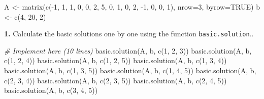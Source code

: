 \documentclass[
]{article}
\newenvironment{Shaded}{\begin{snugshade}}{\end{snugshade}}
\newcommand{\AttributeTok}[1]{\textcolor[rgb]{0.77,0.63,0.00}{#1}}
\newcommand{\CommentTok}[1]{\textcolor[rgb]{0.56,0.35,0.01}{\textit{#1}}}
\newcommand{\ConstantTok}[1]{\textcolor[rgb]{0.00,0.00,0.00}{#1}}
\newcommand{\DecValTok}[1]{\textcolor[rgb]{0.00,0.00,0.81}{#1}}
\newcommand{\FunctionTok}[1]{\textcolor[rgb]{0.00,0.00,0.00}{#1}}
\newcommand{\NormalTok}[1]{#1}
\newcommand{\OtherTok}[1]{\textcolor[rgb]{0.56,0.35,0.01}{#1}}
\newcommand{\SpecialCharTok}[1]{\textcolor[rgb]{0.00,0.00,0.00}{#1}}
\begin{document}
\begin{Shaded}
\begin{Highlighting}[]
\NormalTok{A }\OtherTok{\textless{}{-}} \FunctionTok{matrix}\NormalTok{(}\FunctionTok{c}\NormalTok{(}\SpecialCharTok{{-}}\DecValTok{1}\NormalTok{, }\DecValTok{1}\NormalTok{, }\DecValTok{1}\NormalTok{, }\DecValTok{0}\NormalTok{, }\DecValTok{0}\NormalTok{, }\DecValTok{2}\NormalTok{, }\DecValTok{5}\NormalTok{, }\DecValTok{0}\NormalTok{, }\DecValTok{1}\NormalTok{, }\DecValTok{0}\NormalTok{, }\DecValTok{2}\NormalTok{, }\SpecialCharTok{{-}}\DecValTok{1}\NormalTok{, }\DecValTok{0}\NormalTok{, }\DecValTok{0}\NormalTok{, }\DecValTok{1}\NormalTok{), }\AttributeTok{nrow=}\DecValTok{3}\NormalTok{, }\AttributeTok{byrow=}\ConstantTok{TRUE}\NormalTok{)}
\NormalTok{b }\OtherTok{\textless{}{-}} \FunctionTok{c}\NormalTok{(}\DecValTok{4}\NormalTok{, }\DecValTok{20}\NormalTok{, }\DecValTok{2}\NormalTok{)}
\end{Highlighting}
\end{Shaded}

\textbf{1.} Calculate the basic solutions one by one using the function
\texttt{basic.solution}..

\begin{Shaded}
\begin{Highlighting}[]
\CommentTok{\# Implement here (10 lines)}
\FunctionTok{basic.solution}\NormalTok{(A, b, }\FunctionTok{c}\NormalTok{(}\DecValTok{1}\NormalTok{, }\DecValTok{2}\NormalTok{, }\DecValTok{3}\NormalTok{))}
\FunctionTok{basic.solution}\NormalTok{(A, b, }\FunctionTok{c}\NormalTok{(}\DecValTok{1}\NormalTok{, }\DecValTok{2}\NormalTok{, }\DecValTok{4}\NormalTok{))}
\FunctionTok{basic.solution}\NormalTok{(A, b, }\FunctionTok{c}\NormalTok{(}\DecValTok{1}\NormalTok{, }\DecValTok{2}\NormalTok{, }\DecValTok{5}\NormalTok{))}
\FunctionTok{basic.solution}\NormalTok{(A, b, }\FunctionTok{c}\NormalTok{(}\DecValTok{1}\NormalTok{, }\DecValTok{3}\NormalTok{, }\DecValTok{4}\NormalTok{))}
\FunctionTok{basic.solution}\NormalTok{(A, b, }\FunctionTok{c}\NormalTok{(}\DecValTok{1}\NormalTok{, }\DecValTok{3}\NormalTok{, }\DecValTok{5}\NormalTok{))}
\FunctionTok{basic.solution}\NormalTok{(A, b, }\FunctionTok{c}\NormalTok{(}\DecValTok{1}\NormalTok{, }\DecValTok{4}\NormalTok{, }\DecValTok{5}\NormalTok{))}
\FunctionTok{basic.solution}\NormalTok{(A, b, }\FunctionTok{c}\NormalTok{(}\DecValTok{2}\NormalTok{, }\DecValTok{3}\NormalTok{, }\DecValTok{4}\NormalTok{))}
\FunctionTok{basic.solution}\NormalTok{(A, b, }\FunctionTok{c}\NormalTok{(}\DecValTok{2}\NormalTok{, }\DecValTok{3}\NormalTok{, }\DecValTok{5}\NormalTok{))}
\FunctionTok{basic.solution}\NormalTok{(A, b, }\FunctionTok{c}\NormalTok{(}\DecValTok{2}\NormalTok{, }\DecValTok{4}\NormalTok{, }\DecValTok{5}\NormalTok{))}
\FunctionTok{basic.solution}\NormalTok{(A, b, }\FunctionTok{c}\NormalTok{(}\DecValTok{3}\NormalTok{, }\DecValTok{4}\NormalTok{, }\DecValTok{5}\NormalTok{))}
\end{Highlighting}
\end{Shaded}
\end{document}
